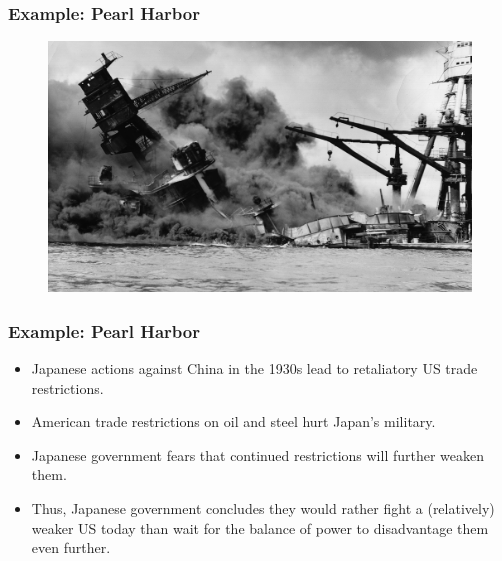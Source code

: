 \documentclass[handout]{beamer}
\begin{document}
\begin{frame} 
	\frametitle{\LARGE{Example: Pearl Harbor}}
	\begin{figure}[ht!]
		\centering
		\includegraphics[height=.9\textheight, keepaspectratio]{Pearlharbor.jpg}
	\end{figure}
\end{frame}

\begin{frame} 
	\frametitle{\LARGE{Example: Pearl Harbor}}
	\begin{itemize}
		\item Japanese actions against China in the 1930s lead to retaliatory US trade restrictions. \pause
		\item American trade restrictions on oil and steel hurt Japan's military. \pause
		\item Japanese government fears that continued restrictions will further weaken them. \pause
		\item Thus, Japanese government concludes they would rather fight a (relatively) weaker US today than wait for the balance of power to disadvantage them even further.
	\end{itemize}
\end{frame}
\end{document}
